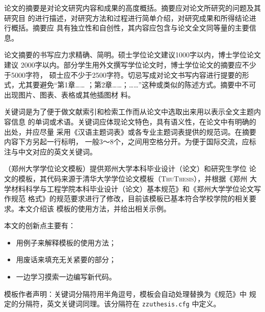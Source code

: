 \begin{cabstract}

论文的摘要是对论文研究内容和成果的高度概括。摘要应对论文所研究的问题及其研究目
的进行描述，对研究方法和过程进行简单介绍，对研究成果和所得结论进行概括。摘要应
具有独立性和自创性，其内容应包含与论文全文同等量的主要信息。

论文摘要的书写应力求精确、简明。硕士学位论文建议1000字以内，博士学位论文建议
2000字以内。部分学生用外文撰写学位论文时，博士学位论文的摘要应不少于5000字符，
硕士应不少于2500字符。切忌写成对论文书写内容进行提要的形式，尤其要避免“第1章……
；第2章……；……”这种或类似的陈述方式。摘要中不可出现图片、图表、表格或其他插图材
料。

关键词是为了便于做文献索引和检索工作而从论文中选取出来用以表示全文主题内容信息
的单词或术语。关键词应体现论文特色，具有语义性，在论文中有明确的出处，并应尽量
采用《汉语主题词表》或各专业主题词表提供的规范词。在摘要内容下方另起一行标明，
一般3～8个，之间用空格分开。为便于国际交流，应标注与中文对应的英文关键词。

\zzuthesis{}（郑州大学学位论文模板）提供郑州大学本科毕业设计（论文）和研究生学位
论文的模板，其代码来源于清华大学学位论文模板（\textsc{ThuThesis}），并根据《郑州
大学材料科学与工程学院本科毕业设计（论文）基本规范》和《郑州大学学位论文写作规范
格式》的规范要求进行了修改，目前该模板已基本符合学校学院的相关要求。本文介绍该
模板的使用方法，并给出相关示例。

本文的创新点主要有：

  \begin{itemize}
    \item 用例子来解释模板的使用方法；
    \item 用废话来填充无关紧要的部分；
    \item 一边学习摸索一边编写新代码。
  \end{itemize}

\textsf{模板作者声明}：关键词分隔符用半角逗号，模板会自动处理替换为《规范》中
规定的分隔符，英文关键词同理。该分隔符在 \verb|zzuthesis.cfg| 中定义。


\end{cabstract}

